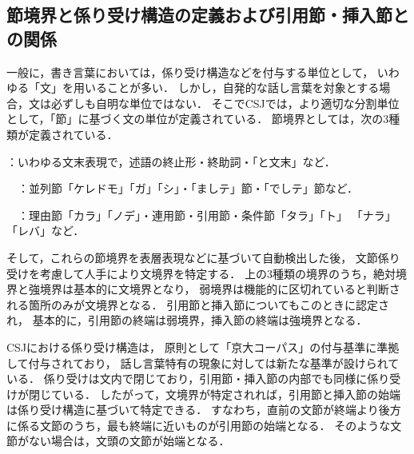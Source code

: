\documentclass[japanese]{jnlp_1.4}
\begin{document}
\subsection{節境界と係り受け構造の定義および引用節・挿入節との関係}\label{sec:ds_problem0}

一般に，書き言葉においては，係り受け構造などを付与する単位として，
いわゆる「文」を用いることが多い．
しかし，自発的な話し言葉を対象とする場合，文は必ずしも自明な単位ではない．
そこでCSJでは，より適切な分割単位として，「節」に基づく文の単位が定義されている．
節境界としては，次の3種類が定義されている．
\par\noindent
{}：いわゆる文末表現で，述語の終止形・終助詞・「と文末」など．
\par\noindent
{}　：並列節「ケレドモ」「ガ」「シ」・「ましテ」節・「でしテ」節など．
\par\noindent
{}　：理由節「カラ」「ノデ」・連用節・引用節・条件節「タラ」「ト」
	「ナラ」「レバ」など．
\par\noindent
そして，これらの節境界を表層表現などに基づいて自動検出した後\cite{maruyama}，
文節係り受けを考慮して人手により文境界を特定する\cite{takanashi}．
上の3種類の境界のうち，絶対境界と強境界は基本的に文境界となり，
弱境界は機能的に区切れていると判断される箇所のみが文境界となる．
引用節と挿入節についてもこのときに認定され，
基本的に，引用節の終端は弱境界，挿入節の終端は強境界となる．

CSJにおける係り受け構造は，
原則として「京大コーパス」\cite{K-corpus}の付与基準に準拠して付与されており，
話し言葉特有の現象に対しては新たな基準が設けられている\cite{csj_kakariuke}．
係り受けは文内で閉じており，引用節・挿入節の内部でも同様に係り受けが閉じている．
したがって，文境界が特定されれば，引用節と挿入節の始端は係り受け構造に基づいて特定できる．
すなわち，直前の文節が終端より後方に係る文節のうち，最も終端に近いものが引用節の始端となる．
そのような文節がない場合は，文頭の文節が始端となる．
\end{document}
